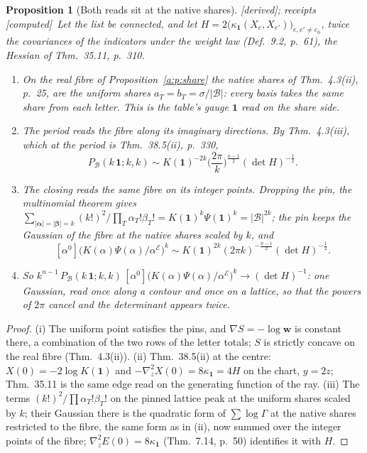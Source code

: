 \documentclass[11pt]{article}
\newcommand{\cE}{\mathcal E}
\newcommand{\cB}{\mathcal B}
\newcommand{\one}{\mathbf 1}
\newcommand{\Pc}[1]{P_{\cB}(#1\,\one;#1,#1)}
\newcommand{\Clo}[1]{[\alpha^0]\big(K(\alpha)\Psi(\alpha)/\alpha^{\cE}\big)^{#1}}
\theoremstyle{plain}
\newtheorem{proposition}{Proposition}[section]
\theoremstyle{definition}
\theoremstyle{remark}
\newcommand{\derived}{\textup{[derived]}}
\newcommand{\computed}{\textup{[computed]}}
\begin{document}
\begin{proposition}[Both reads sit at the native shares]\label{a:p:edge}\derived; receipts \computed\
Let the list be connected, and let $H=2\big(\kappa_{\one}(X_e,X_{e'})\big)_{e,e'\neq e_0}$, twice the covariances of the indicators under the weight law (Def.~9.2, p.~61), the Hessian of Thm.~35.11, p.~310.
\begin{enumerate}[label=(\roman*)]
\item On the real fibre of Proposition~\ref{a:p:share} the native shares of Thm.~4.3(ii), p.~25, are the uniform shares $a_T=b_T=\sigma/|\cB|$: every basis takes the same share from each letter. This is the table's gauge $\one$ read on the share side.
\item The period reads the fibre along its imaginary directions. By Thm.~4.3(iii), which at the period is Thm.~38.5(ii), p.~330,
\[
\Pc k\sim K(\one)^{-2k}\Big(\frac{2\pi}k\Big)^{\frac{n-1}2}(\det H)^{-\frac12}.
\]
\item The closing reads the same fibre on its integer points. Dropping the pin, the multinomial theorem gives $\sum_{|\boldsymbol\alpha|=|\boldsymbol\beta|=k}(k!)^2/\prod_T\alpha_T!\beta_T!=K(\one)^k\Psi(\one)^k=|\cB|^{2k}$; the pin keeps the Gaussian of the fibre at the native shares scaled by $k$, and
\[
\Clo k\sim K(\one)^{2k}(2\pi k)^{-\frac{n-1}2}(\det H)^{-\frac12}.
\]
\item So $k^{n-1}\,\Pc k\,\Clo k\to(\det H)^{-1}$: one Gaussian, read once along a contour and once on a lattice, so that the powers of $2\pi$ cancel and the determinant appears twice.
\end{enumerate}
\end{proposition}

\begin{proof}
(i) The uniform point satisfies the pins, and $\nabla S=-\log\mathbf w$ is constant there, a combination of the two rows of the letter totals; $S$ is strictly concave on the real fibre (Thm.~4.3(ii)). (ii) Thm.~38.5(ii) at the centre: $X(0)=-2\log K(\one)$ and $-\nabla_z^2X(0)=8\kappa_{\one}=4H$ on the chart, $y=2z$; Thm.~35.11 is the same edge read on the generating function of the ray. (iii) The terms $(k!)^2/\prod\alpha_T!\beta_T!$ on the pinned lattice peak at the uniform shares scaled by $k$; their Gaussian there is the quadratic form of $\sum\log\Gamma$ at the native shares restricted to the fibre, the same form as in (ii), now summed over the integer points of the fibre; $\nabla^2_zE(0)=8\kappa_{\one}$ (Thm.~7.14, p.~50) identifies it with $H$.
\end{proof}
\end{document}
